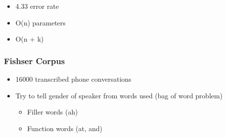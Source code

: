       \begin{itemize}
        \item 4.33 error rate
        \item O(n) parameters
        \item O(n + k)
      \end{itemize}

    \subsubsection{Fishser Corpus}

      \begin{itemize}
        \item 16000 transcribed phone conversations
        \item Try to tell gender of speaker from words used (bag of word problem)
        \begin{itemize}
          \item Filler words (ah)
          \item Function words (at, and)
        \end{itemize}
      \end{itemize}